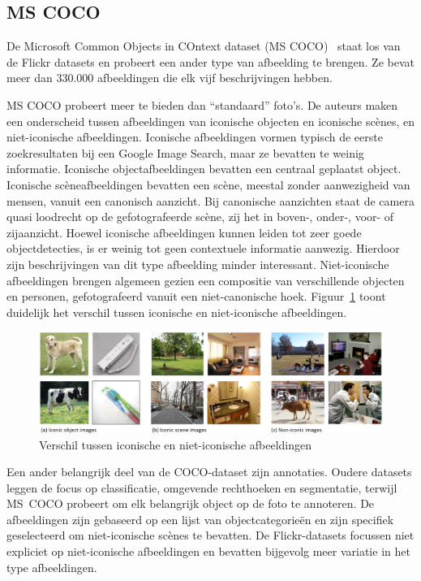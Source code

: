 \subsection{MS COCO}
\label{par:MS COCO}
De Microsoft Common Objects in COntext dataset (MS COCO)~\cite{Lin2014} staat los van de Flickr datasets en probeert een ander type van afbeelding te brengen. Ze bevat meer dan 330.000 afbeeldingen die elk vijf beschrijvingen hebben. 

MS COCO probeert meer te bieden dan ``standaard'' foto's. De auteurs maken een onderscheid tussen afbeeldingen van iconische objecten en iconische sc\`enes, en niet-iconische afbeeldingen. Iconische afbeeldingen vormen typisch de eerste zoekresultaten bij een Google Image Search, maar ze bevatten te weinig informatie. Iconische objectafbeeldingen bevatten een centraal geplaatst object. Iconische sc\`eneafbeeldingen bevatten een sc\`ene, meestal zonder aanwezigheid van mensen, vanuit een canonisch aanzicht. Bij canonische aanzichten staat de camera quasi loodrecht op de gefotografeerde sc\`ene, zij het in boven-, onder-, voor- of zijaanzicht. Hoewel iconische afbeeldingen kunnen leiden tot zeer goede objectdetecties, is er weinig tot geen contextuele informatie aanwezig. Hierdoor zijn beschrijvingen van dit type afbeelding minder interessant.  Niet-iconische afbeeldingen brengen algemeen gezien een compositie van verschillende objecten en personen, gefotografeerd vanuit een niet-canonische hoek. Figuur~\ref{fig:cocotypes} toont duidelijk het verschil tussen iconische en niet-iconische afbeeldingen.

\begin{figure}[tb]
	\centering
	\includegraphics[width=\linewidth]{Images/iconic.jpg}
	\caption[Verschil tussen iconische en niet-iconische afbeeldingen]{Verschil tussen iconische en niet-iconische afbeeldingen~\cite{Lin2014}}
	\label{fig:cocotypes}
\end{figure}

Een ander belangrijk deel van de COCO-dataset zijn annotaties. Oudere datasets leggen de focus op classificatie, omgevende rechthoeken en segmentatie, terwijl \mbox{MS COCO} probeert om elk belangrijk object op de foto te annoteren. De afbeeldingen zijn gebaseerd op een lijst van objectcategorie\"en en zijn specifiek geselecteerd om niet-iconische sc\`enes te bevatten. De Flickr-datasets focussen niet expliciet op niet-iconische afbeeldingen en bevatten bijgevolg meer variatie in het type afbeeldingen.

